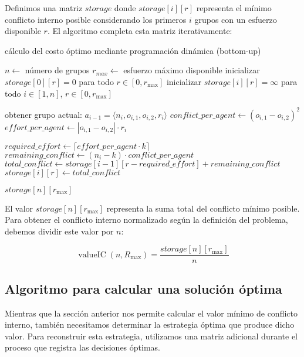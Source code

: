 Definimos una matriz $storage$ donde $storage[i][r]$ representa el mínimo conflicto interno posible considerando los primeros $i$ grupos con un esfuerzo disponible $r$. El algoritmo completa esta matriz iterativamente:

\begin{algorithm}[H]
	\caption{cálculo del costo óptimo mediante programación dinámica (bottom-up)}
	\begin{algorithmic}[1]
		\State $n \gets$ número de grupos
		\State $r_{max} \gets$ esfuerzo máximo disponible
		\State inicializar $storage[0][r] = 0$ para todo $r \in [0,r_{ \max }]$
		\State inicializar $storage[i][r] = \infty$ para todo $i \in [1,n]$, $r \in [0, r_{ \max }]$

			\State obtener grupo actual: $a_{ i - 1 } = \langle n_i,o_{ i,1 },o_{ i,2 },r_i \rangle$
			\State $conflict\_per\_agent \gets (o_{ i,1 } - o_{ i,2 })^2$
			\State $effort\_per\_agent \gets |o_{ i,1 } - o_{ i,2 }| \cdot r_i$

					\State $required\_effort \gets \lceil effort\_per\_agent \cdot k \rceil$
						\State $remaining\_conflict \gets (n_i - k) \cdot conflict\_per\_agent$
						\State $total\_conflict \gets storage[i - 1][r-required\_effort] + remaining\_conflict$
							\State $storage[i][r] \gets total\_conflict$
						\EndIf
					\EndIf
				\EndFor
			\EndFor
		\EndFor

		\State \Return $storage[n][r_{ \max }]$
	\end{algorithmic}
\end{algorithm}

El valor $storage[n][r_{ \max }]$ representa la suma total del conflicto mínimo posible. Para obtener el conflicto interno normalizado según la definición del problema, debemos dividir este valor por $n$:

\begin{equation}
	\operatorname{ valueIC }(n,R_{ \max }) = \frac{ storage[n][r_{ \max }] }{ n }
\end{equation}

\subsection{Algoritmo para calcular una solución óptima}

Mientras que la sección anterior nos permite calcular el valor mínimo de conflicto interno, también necesitamos determinar la estrategia óptima que produce dicho valor. Para reconstruir esta estrategia, utilizamos una matriz adicional durante el proceso que registra las decisiones óptimas.

